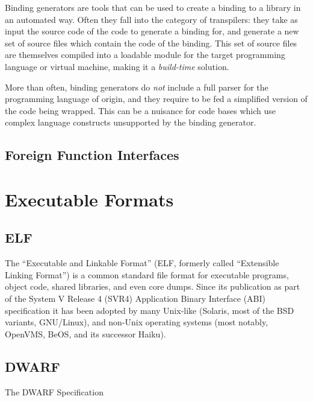 Binding generators are tools that can be used to create a binding to a library
in an automated way. Often they fall into the category of \glspl{transpiler}:
they take as input the source code of the code to generate a binding for,
and generate a new set of source files which contain the code of the binding.
This set of source files are themselves compiled into a loadable module for
the target programming language or virtual machine, making it a
\emph{build-time} solution.

More than often, binding generators do \emph{not} include a full parser for
the programming language of origin, and they require to be fed a simplified
version of the code being wrapped. This can be a nuisance for code bases which
use complex language constructs unsupported by the binding generator.


%


\subsection{Foreign Function Interfaces}


%

\section{Executable Formats}

\subsection{ELF}

The “Executable and Linkable Format” (ELF, formerly called “Extensible Linking
Format”) is a common standard file format for executable programs, object
code, shared libraries, and even core dumps. Since its publication as part of
the System V Release 4 (SVR4) Application Binary Interface (ABI) specification
\cite[c.~4]{elfspec-sysv}
it has been adopted by many Unix-like (Solaris, most of the BSD variants,
GNU/Linux), and non-Unix operating systems (most notably, OpenVMS, BeOS, and
its successor Haiku).

\subsection{DWARF}

The DWARF Specification \cite{dwarfspecv4}


